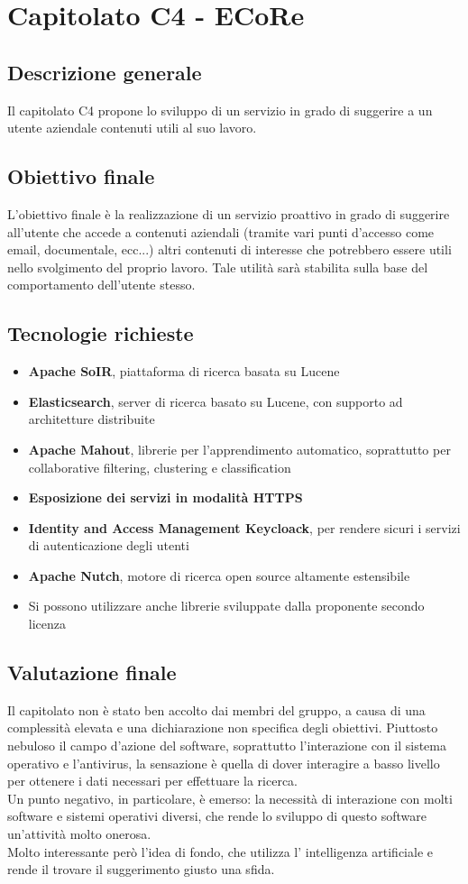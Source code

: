 \documentclass[StudioDiFattibilità.tex]{subfiles}
\begin{document}
\chapter{Capitolato C4 - ECoRe}
\section{Descrizione generale}
Il capitolato C4 propone lo sviluppo di un servizio in grado di suggerire a un utente aziendale contenuti utili al suo lavoro.
\section{Obiettivo finale}
L'obiettivo finale è la realizzazione di un servizio proattivo in grado di suggerire all'utente che accede a contenuti aziendali (tramite vari punti d'accesso come email, documentale, ecc...) altri contenuti di interesse che potrebbero essere utili nello svolgimento del proprio lavoro. Tale utilità sarà stabilita sulla base del comportamento dell'utente stesso.
\section{Tecnologie richieste}
\begin{itemize}
	\item \textbf{Apache SoIR}, piattaforma di ricerca basata su Lucene
	\item \textbf{Elasticsearch}, server di ricerca basato su Lucene, con supporto ad architetture distribuite
	\item \textbf{Apache Mahout}, librerie per l'apprendimento automatico, soprattutto per collaborative filtering, clustering e classification
	\item \textbf{Esposizione dei servizi in modalità HTTPS}
	\item \textbf{Identity and Access Management Keycloack}, per rendere sicuri i servizi di autenticazione degli utenti
	\item \textbf{Apache Nutch}, motore di ricerca open source altamente estensibile
	\item Si possono utilizzare anche librerie  sviluppate dalla proponente secondo licenza
\end{itemize}
\section{Valutazione finale}
Il capitolato non è stato ben accolto dai membri del gruppo, a causa di una complessità elevata e una dichiarazione non specifica degli obiettivi. Piuttosto nebuloso il campo d'azione del software, soprattutto l'interazione con il sistema operativo e l'antivirus, la sensazione è quella di dover interagire a basso livello per ottenere i dati necessari per effettuare la ricerca.\\
Un punto negativo, in particolare, è emerso: la necessità di interazione con molti software e sistemi operativi diversi, che rende lo sviluppo di questo software un'attività molto onerosa.\\
Molto interessante però l'idea di fondo, che utilizza l' intelligenza artificiale e rende il trovare il suggerimento giusto una sfida.
\end{document}
